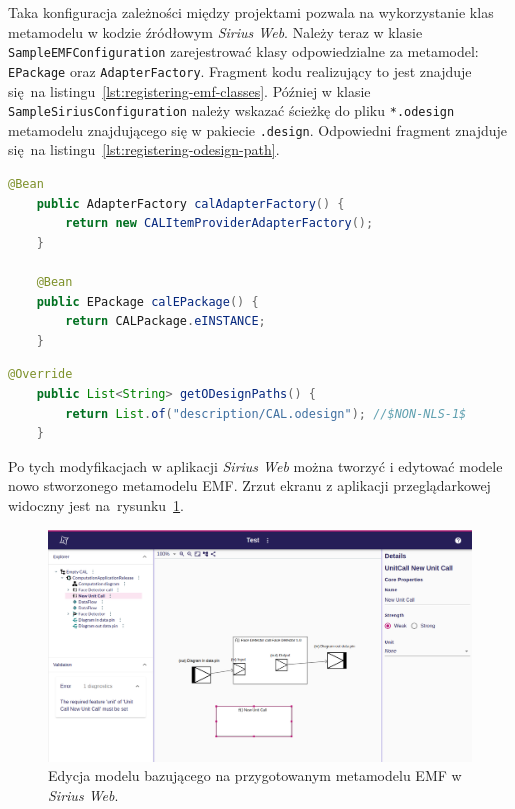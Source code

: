 Taka konfiguracja zależności między projektami pozwala na wykorzystanie klas
metamodelu w kodzie źródłowym \emph{Sirius Web}. Należy teraz w klasie
\texttt{SampleEMFConfiguration} zarejestrować klasy
odpowiedzialne za metamodel: \texttt{EPackage} oraz \texttt{AdapterFactory}.
Fragment kodu realizujący to jest znajduje się na
listingu~\ref{lst:registering-emf-classes}. Później w klasie
\texttt{SampleSiriusConfiguration} należy wskazać ścieżkę do pliku
\texttt{*.odesign} metamodelu znajdującego się w pakiecie \texttt{.design}.
Odpowiedni fragment znajduje się na
listingu~\ref{lst:registering-odesign-path}.

\begin{lstlisting}[language=Java,
    caption={Rejestracja klas przygotowanego metamodelu EMF w klasie
    \texttt{SampleEMFConfiguration}.},
    label={lst:registering-emf-classes}]
    @Bean
    public AdapterFactory calAdapterFactory() {
        return new CALItemProviderAdapterFactory();
    }

    @Bean
    public EPackage calEPackage() {
        return CALPackage.eINSTANCE;
    }
\end{lstlisting}

\begin{lstlisting}[language=Java,
    caption={Wskazanie ścieżki do pliku \texttt{*.odesign} w klasie
    \texttt{SampleSiriusConfiguration}.},
    label={lst:registering-odesign-path}]
    @Override
    public List<String> getODesignPaths() {
        return List.of("description/CAL.odesign"); //$NON-NLS-1$
    }
\end{lstlisting}

Po tych modyfikacjach w aplikacji \emph{Sirius Web} można tworzyć i edytować
modele nowo stworzonego metamodelu \gls{EMF}. Zrzut ekranu z aplikacji
przeglądarkowej widoczny jest
na~rysunku~\ref{rys:sirius-web-base-metamodel-model}.

\begin{figure}[!hb]
  \centering

  \includegraphics[width=0.95\linewidth]{./images/sirius-web-base-metamodel-model.png}
  \caption{Edycja modelu bazującego na przygotowanym metamodelu EMF w
  \emph{Sirius Web}.}\label{rys:sirius-web-base-metamodel-model}
\end{figure}

